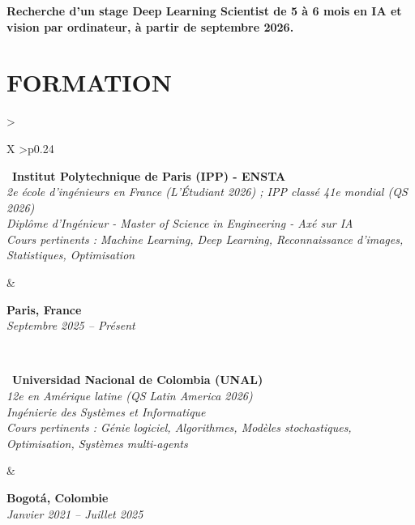 \documentclass[letterpaper,10pt]{article}
\begin{document}
\textbf{Recherche d'un stage Deep Learning Scientist de 5 à 6 mois en IA et vision par ordinateur, à partir de septembre 2026.} 


\vspace{-0.05cm}

\section{\textcolor{mydarkgreen}{\textbf{FORMATION}}}

\begin{tabularx}{\textwidth}{>{\raggedright\arraybackslash}X >{\raggedleft\arraybackslash}p{0.24\textwidth}}
  \begin{minipage}[t]{\linewidth}\raggedright
  \textbullet\ \textbf{Institut Polytechnique de Paris (IPP) - ENSTA}\\
  \textit{\footnotesize 2e école d'ingénieurs en France (L'Étudiant 2026) ; IPP classé 41e mondial (QS 2026)}\\
  \textit{\footnotesize Diplôme d'Ingénieur - Master of Science in Engineering - Axé sur IA}\\
  \textit{\footnotesize Cours pertinents : Machine Learning, Deep Learning, Reconnaissance d'images, Statistiques, Optimisation}
  \end{minipage}
  &
  \begin{minipage}[t]{\linewidth}\raggedleft
  \textbf{Paris, France}\\
  {\footnotesize\textit{Septembre 2025 -- Présent}}
  \end{minipage}
  \\
  \begin{minipage}[t]{\linewidth}
  \textbullet\ \textbf{Universidad Nacional de Colombia (UNAL)}\\
  \textit{\footnotesize 12e en Amérique latine (QS Latin America 2026)}\\
  \textit{\footnotesize Ingénierie des Systèmes et Informatique}\\
  \textit{\footnotesize Cours pertinents : Génie logiciel, Algorithmes, Modèles stochastiques, Optimisation, Systèmes multi-agents}
  \end{minipage}
  &
  \begin{minipage}[t]{\linewidth}\raggedleft
  \textbf{Bogotá, Colombie}\\
  {\footnotesize\textit{Janvier 2021 -- Juillet 2025}}

\end{minipage}
\end{tabularx}
\end{document}
